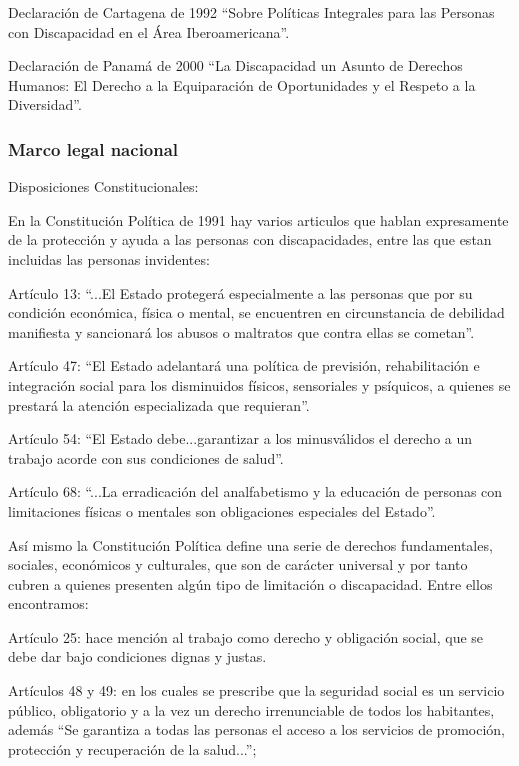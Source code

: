 \documentclass[a4paper, 12pt, oneside]{article}
\begin{document}
	Declaración de Cartagena de 1992 “Sobre Políticas Integrales para las Personas con Discapacidad en el Área Iberoamericana”.

	Declaración de Panamá de 2000 “La Discapacidad un Asunto de Derechos Humanos: El Derecho a la Equiparación de Oportunidades y el Respeto a la Diversidad”.

	\subsubsection{Marco legal nacional}

	Disposiciones Constitucionales:

	En la Constitución Política de 1991 hay varios articulos que hablan expresamente de la protección y ayuda a las personas con discapacidades, entre las que estan incluidas las personas invidentes:

	Artículo 13: “...El Estado protegerá especialmente a las personas que por su condición económica, física o mental, se encuentren en circunstancia de debilidad manifiesta y sancionará los abusos o maltratos que contra ellas se cometan”.

	Artículo 47: “El Estado adelantará una política de previsión, rehabilitación e integración social para los disminuidos físicos, sensoriales y psíquicos, a quienes se prestará la atención especializada que requieran”.

	Artículo 54: “El Estado debe...garantizar a los minusválidos el derecho a un trabajo acorde con sus condiciones de salud”.

	Artículo 68: “...La erradicación del analfabetismo y la educación de personas con limitaciones físicas o mentales son obligaciones especiales del Estado”.

	Así mismo la Constitución Política define una serie de derechos fundamentales, sociales, económicos y culturales, que son de carácter universal y por tanto cubren a quienes presenten algún tipo de limitación o discapacidad. Entre ellos encontramos:

	Artículo 25: hace mención al trabajo como derecho y obligación social, que se debe dar bajo condiciones dignas y justas.

	Artículos 48 y 49: en los cuales se prescribe que la seguridad social es un servicio público, obligatorio y a la vez un derecho irrenunciable de todos los habitantes, además “Se garantiza a todas las personas el acceso a los servicios de promoción, protección y recuperación de la salud...”;
\end{document}
